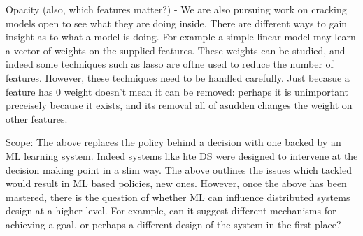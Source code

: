 \documentclass[a4paper,twocolumn]{article}
\newcommand{\ignore}[1]{}
\begin{document}
Opacity (also, which features matter?)
- We are also pursuing work on cracking models open to see what they are doing inside.
There are different ways to gain insight as to what a model is doing. For example a simple
linear model may learn a vector of weights on the supplied features. These weights can be
studied, and indeed some techniques such as lasso are oftne used to reduce the number of features. However, these
techniques need to be handled carefully. Just becasue a feature has 0 weight doesn't mean it
can be removed: perhaps it is unimportant preceisely because it exists, and its removal all of
asudden changes the weight on other features.


\ignore{
contextual multi-armed bandits. idea is to provide a context, get an action,
and only observe reward for that action. This matches the dist systems world well. It will generate new
policies using ML that we could not come up with by just thinking, and may not
even be able to describe. We argue in favor of opacity and rely instead on the guarantees
provided by the ML optimization.
}


Scope:
The above replaces the policy behind a decision with one backed by an ML learning system.
Indeed systems like hte DS were designed to intervene at the decision making point in a
slim way. The above outlines the issues which tackled would result in ML based policies,
new ones. However, once the above has been mastered, there is the question of whether ML
can influence distributed systems design at a higher level. For example, can it suggest
different mechanisms for achieving a goal, or perhaps a different design of the system in the first place?
\end{document}
